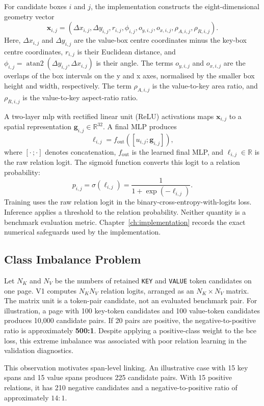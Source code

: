 For candidate boxes $i$ and $j$, the implementation constructs the
eight-dimensional geometry vector
\[
  \mathbf{x}_{i,j}
  =(\Delta x_{i,j},\Delta y_{i,j},r_{i,j},\phi_{i,j},
    o_{y,i,j},o_{x,i,j},\rho_{A,i,j},\rho_{R,i,j}).
\]
Here, $\Delta x_{i,j}$ and $\Delta y_{i,j}$ are the value-box centre
coordinates minus the key-box centre coordinates,
$r_{i,j}$ is their Euclidean distance, and
$\phi_{i,j}=\operatorname{atan2}(\Delta y_{i,j},\Delta x_{i,j})$ is their
angle. The terms $o_{y,i,j}$ and $o_{x,i,j}$ are the overlaps of the box
intervals on the y and x axes, normalised by the smaller box height and width,
respectively. The term $\rho_{A,i,j}$ is the value-to-key area ratio, and
$\rho_{R,i,j}$ is the value-to-key aspect-ratio ratio.

A two-layer \gls{mlp} with rectified linear unit (ReLU) activations maps
$\mathbf{x}_{i,j}$ to a spatial representation
$\mathbf{g}_{i,j}\in\mathbb{R}^{32}$. A final MLP produces
\[
  \ell_{i,j}
  =f_{\mathrm{out}}([u_{i,j};\mathbf{g}_{i,j}]),
\]
where $[\cdot\,;\cdot]$ denotes concatenation,
$f_{\mathrm{out}}$ is the learned final MLP, and
$\ell_{i,j}\in\mathbb{R}$ is the raw relation logit. The sigmoid function
converts this logit to a relation probability:
\[
  p_{i,j}
  =\sigma(\ell_{i,j})
  =\frac{1}{1+\exp(-\ell_{i,j})}.
\]
Training uses the raw relation logit in the
binary-cross-entropy-with-logits loss. Inference applies a threshold to the
relation probability. Neither quantity is a benchmark evaluation metric.
Chapter~\ref{ch:implementation} records the exact numerical safeguards used
by the implementation.

\subsection{Class Imbalance Problem}
\label{sec:v1-imbalance}

Let $N_K$ and $N_V$ be the numbers of retained \texttt{KEY} and
\texttt{VALUE} token candidates on one page. V1 computes $N_KN_V$ relation
logits, arranged as an $N_K\times N_V$ matrix. The matrix unit is a token-pair
candidate, not an evaluated benchmark pair. For illustration, a page with 100
key-token candidates and 100 value-token candidates produces 10{,}000
candidate pairs. If 20 pairs are positive, the negative-to-positive ratio is
approximately \textbf{500:1}. Despite applying a positive-class weight to the
\gls{bce} loss, this extreme imbalance was associated with poor relation
learning in the validation diagnostics.

This observation motivates span-level linking. An illustrative case with 15
key spans and 15 value spans produces 225 candidate pairs. With 15 positive
relations, it has 210 negative candidates and a negative-to-positive ratio of
approximately $14{:}1$.

